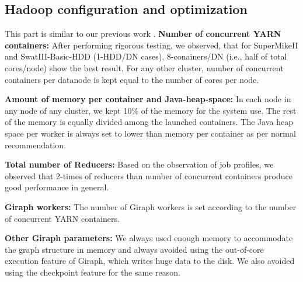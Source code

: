\documentclass[journal]{IEEEtran}
\begin{document}
\subsection{Hadoop configuration and optimization} 
This part is similar to our previous work \cite{}.
\textbf{Number of concurrent YARN containers:} After performing rigorous testing,  we observed, that for SuperMikeII and SwatIII-Basic-HDD (1-HDD/DN cases), 8-conainers/DN (i.e., half of total cores/node) show the best result. For any other cluster, number of concurrent containers per datanode is kept equal to the number of cores per node. 

\textbf{Amount of memory per container and Java-heap-space:} In each node in any node of any cluster, we kept 10\% of the memory for the system use. The rest of the memory is equally divided among the launched containers. The Java heap space per worker is always set to lower than memory per container as per normal recommendation.

\textbf{Total number of Reducers:} Based on the observation of job profiles, we observed that 2-times of reducers than number of concurrent containers produce good performance in general. 

\textbf{Giraph workers:} The number of Giraph workers is set according to the number of concurrent YARN containers.

\textbf{Other Giraph parameters:} We always used enough memory to accommodate the graph structure in memory and always avoided using the out-of-core execution feature of Giraph, which writes huge data to the disk. We also avoided using the checkpoint feature for the same reason.
\end{document}
